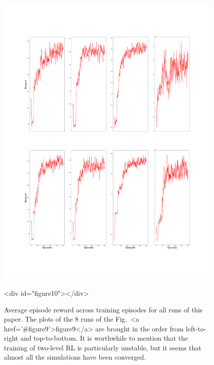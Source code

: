 \documentclass{article}
\begin{document}
\begin{figure}
\centering
\includegraphics[width=0.7\linewidth]{"A_Multi-agent_Reinforcement_Learning_Study_of_Emergence_of_Social_Classes_out_of_Arbitrary_Governance_The_Role_of_Environment_Plots/Average_Episode_Reward_across_Training"}
\caption{Average episode reward across training  episodes \textendash for all runs of this paper. The plots of the 8 runs of the Fig.~<a href='#figure9'>figure9</a> are brought in the order from left-to-right and top-to-bottom. It is worthwhile to mention that the training of two-level RL is particularly unstable, but it seems that almost all the simulations have been converged.}
<div id="figure10"></div>

\end{figure}
\end{document}
